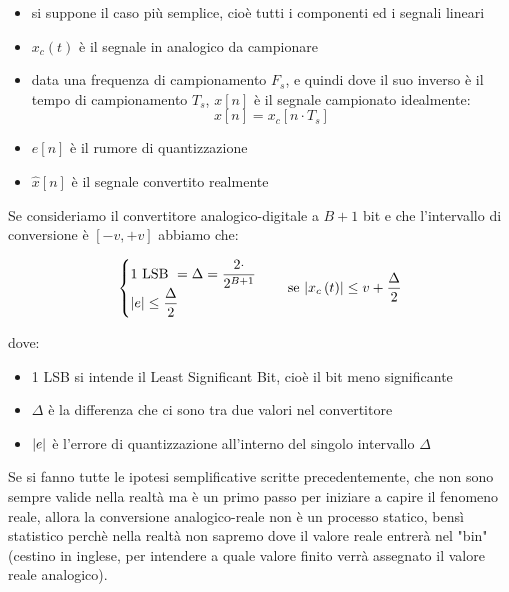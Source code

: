 \begin{itemize}
    \item si suppone il caso più semplice, cioè tutti i componenti ed i segnali lineari 
    \item $x_c \left(t\right)$ è il segnale in analogico da campionare 
    \item data una frequenza di campionamento $F_s$, e quindi dove il suo inverso è il tempo di campionamento $T_s$, $x \left[ n\right]$ è il segnale campionato idealmente: 
    {
        \Large 
        \begin{equation}
            x \left[ n\right] = x_c \left[ n \cdot T_s\right]
        \end{equation}
    }
    \item $e \left[ n\right]$ è il rumore di quantizzazione 
    \item $\hat{x} \left[ n\right]$ è il segnale convertito realmente 
\end{itemize}

Se consideriamo il convertitore analogico-digitale a $B + 1$ bit e che l'intervallo di conversione è $\left[ -v, +v\right]$ abbiamo che: 

{
    \Large 
    \begin{equation}
        \setlength{\jot}{10pt} %
        \begin{cases}
        1 \text{ LSB } = \Delta = \dfrac{2 \cdot}{2^{B + 1}} 
        \\    
        \abs{e} \leq \dfrac{\Delta}{2}
        \end{cases}
        \quad 
        \text{se }
        \abs{x_{c} \left(t\right)} \leq v + \dfrac{\Delta}{2}
    \end{equation}
}

dove: 

\begin{itemize}
    \item 1 LSB si intende il Least Significant Bit, cioè il bit meno significante 
    \item $\Delta$ è la differenza che ci sono tra due valori nel convertitore 
    \item $\abs{e}$ è l'errore di quantizzazione all'interno del singolo intervallo $\Delta$
\end{itemize}

Se si fanno tutte le ipotesi semplificative scritte precedentemente, che non sono sempre valide nella realtà ma è un primo passo per iniziare a capire il fenomeno reale, 
allora la conversione analogico-reale non è un processo statico, bensì statistico perchè nella realtà non sapremo dove il valore reale entrerà nel "bin" (cestino in inglese, per intendere a quale valore finito verrà assegnato il valore reale analogico). \newline 

